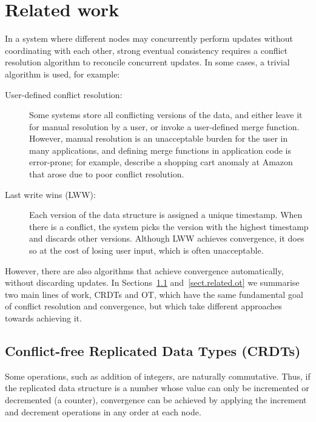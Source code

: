 \section{Related work}\label{sect.relatedwork}

In a system where different nodes may concurrently perform updates without coordinating with each other, strong eventual consistency requires a conflict resolution algorithm to reconcile concurrent updates. 
In some cases, a trivial algorithm is used, for example:

\begin{description}
\item[User-defined conflict resolution:] Some systems store all conflicting versions of the data,
and either leave it for manual resolution by a user, or invoke a user-defined merge function.
However, manual resolution is an unacceptable burden for the user in many applications, and defining
merge functions in application code is error-prone; for example, \citet{DeCandia:2007ui} describe a
shopping cart anomaly at Amazon that arose due to poor conflict resolution.

\item[Last write wins (LWW):] Each version of the data structure is assigned a unique timestamp.
When there is a conflict, the system picks the version with the highest timestamp and discards other
versions. Although LWW achieves convergence, it does so at the cost of losing user input, which is
often unacceptable.
\end{description}

However, there are also algorithms that achieve convergence automatically, without discarding
updates. In Sections~\ref{sect.related.crdts} and~\ref{sect.related.ot} we summarise two main lines
of work, CRDTs and OT, which have the same fundamental goal of conflict resolution and convergence,
but which take different approaches towards achieving it.

\subsection{Conflict-free Replicated Data Types (CRDTs)}\label{sect.related.crdts}

Some operations, such as addition of integers, are naturally commutative. Thus, if the replicated
data structure is a number whose value can only be incremented or decremented (a counter),
convergence can be achieved by applying the increment and decrement operations in any order at each
node.

